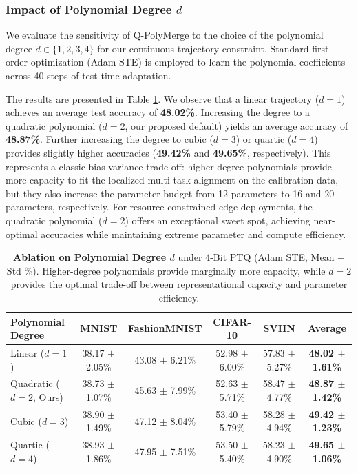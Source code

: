 \subsubsection{Impact of Polynomial Degree $d$}
We evaluate the sensitivity of Q-PolyMerge to the choice of the polynomial degree $d \in \{1, 2, 3, 4\}$ for our continuous trajectory constraint. Standard first-order optimization (Adam STE) is employed to learn the polynomial coefficients across 40 steps of test-time adaptation. 

The results are presented in Table \ref{tab:degree_ablation}. We observe that a linear trajectory ($d=1$) achieves an average test accuracy of \textbf{48.02\%}. Increasing the degree to a quadratic polynomial ($d=2$, our proposed default) yields an average accuracy of \textbf{48.87\%}. Further increasing the degree to cubic ($d=3$) or quartic ($d=4$) provides slightly higher accuracies (\textbf{49.42\%} and \textbf{49.65\%}, respectively). This represents a classic bias-variance trade-off: higher-degree polynomials provide more capacity to fit the localized multi-task alignment on the calibration data, but they also increase the parameter budget from 12 parameters to 16 and 20 parameters, respectively. For resource-constrained edge deployments, the quadratic polynomial ($d=2$) offers an exceptional sweet spot, achieving near-optimal accuracies while maintaining extreme parameter and compute efficiency.

\begin{table}[h]
\centering
\caption{\textbf{Ablation on Polynomial Degree $d$} under 4-Bit PTQ (Adam STE, Mean $\pm$ Std \%). Higher-degree polynomials provide marginally more capacity, while $d=2$ provides the optimal trade-off between representational capacity and parameter efficiency.}
\label{tab:degree_ablation}
\vskip 0.15in
\begin{small}
\begin{sc}
\begin{tabular}{lccccc}
\toprule
Polynomial Degree & MNIST & FashionMNIST & CIFAR-10 & SVHN & Average \\
\midrule
Linear ($d=1$) & 38.17 $\pm$ 2.05\% & 43.08 $\pm$ 6.21\% & 52.98 $\pm$ 6.00\% & 57.83 $\pm$ 5.27\% & \textbf{48.02 $\pm$ 1.61\%} \\
Quadratic ($d=2$, Ours) & 38.73 $\pm$ 1.07\% & 45.63 $\pm$ 7.99\% & 52.63 $\pm$ 5.71\% & 58.47 $\pm$ 4.77\% & \textbf{48.87 $\pm$ 1.42\%} \\
Cubic ($d=3$) & 38.90 $\pm$ 1.49\% & 47.12 $\pm$ 8.04\% & 53.40 $\pm$ 5.79\% & 58.28 $\pm$ 4.94\% & \textbf{49.42 $\pm$ 1.23\%} \\
Quartic ($d=4$) & 38.93 $\pm$ 1.86\% & 47.95 $\pm$ 7.51\% & 53.50 $\pm$ 5.40\% & 58.23 $\pm$ 4.90\% & \textbf{49.65 $\pm$ 1.06\%} \\
\bottomrule
\end{tabular}
\end{sc}
\end{small}
\end{table}

